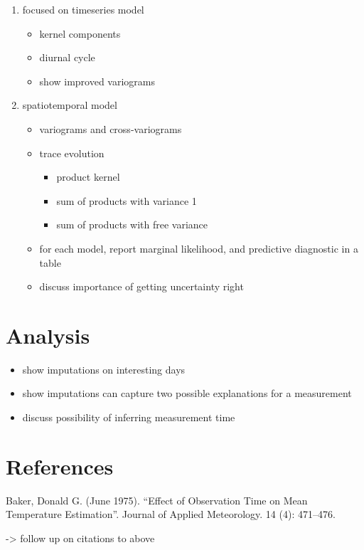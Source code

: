 \documentclass[letter]{article}
\providecommand{\tightlist}{%
      \setlength{\itemsep}{0pt}\setlength{\parskip}{0pt}}
\providecommand{\tightlist}{%
  	  \setlength{\itemsep}{0pt}\setlength{\parskip}{0pt}}
\begin{document}
    	\begin{enumerate}
\def\labelenumi{\arabic{enumi}.}
\tightlist
\item
  focused on timeseries model

  \begin{itemize}
  \tightlist
  \item
    kernel components
  \item
    diurnal cycle
  \item
    show improved variograms
  \end{itemize}
\item
  spatiotemporal model

  \begin{itemize}
  \tightlist
  \item
    variograms and cross-variograms
  \item
    trace evolution

    \begin{itemize}
    \tightlist
    \item
      product kernel
    \item
      sum of products with variance 1
    \item
      sum of products with free variance
    \end{itemize}
  \item
    for each model, report marginal likelihood, and predictive
    diagnostic in a table
  \item
    discuss importance of getting uncertainty right
  \end{itemize}
\end{enumerate}
    


    	\section{Analysis}\label{analysis}

\begin{itemize}
\tightlist
\item
  show imputations on interesting days
\item
  show imputations can capture two possible explanations for a
  measurement
\item
  discuss possibility of inferring measurement time
\end{itemize}
    


    	\section{References}\label{references}

Baker, Donald G. (June 1975). ``Effect of Observation Time on Mean
Temperature Estimation''. Journal of Applied Meteorology. 14 (4):
471--476.

-\textgreater{} follow up on citations to above
    



    
    
    
    
\end{document}
